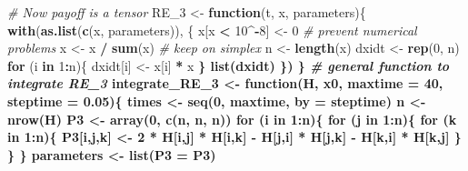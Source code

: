\documentclass[
]{book}
\newenvironment{Shaded}{\begin{snugshade}}{\end{snugshade}}
\newcommand{\CommentTok}[1]{\textcolor[rgb]{0.56,0.35,0.01}{\textit{#1}}}
\newcommand{\ControlFlowTok}[1]{\textcolor[rgb]{0.13,0.29,0.53}{\textbf{#1}}}
\newcommand{\DataTypeTok}[1]{\textcolor[rgb]{0.13,0.29,0.53}{#1}}
\newcommand{\DecValTok}[1]{\textcolor[rgb]{0.00,0.00,0.81}{#1}}
\newcommand{\FloatTok}[1]{\textcolor[rgb]{0.00,0.00,0.81}{#1}}
\newcommand{\KeywordTok}[1]{\textcolor[rgb]{0.13,0.29,0.53}{\textbf{#1}}}
\newcommand{\NormalTok}[1]{#1}
\newcommand{\OperatorTok}[1]{\textcolor[rgb]{0.81,0.36,0.00}{\textbf{#1}}}
\newcommand{\StringTok}[1]{\textcolor[rgb]{0.31,0.60,0.02}{#1}}
\begin{document}
\begin{Shaded}
\begin{Highlighting}[]
\CommentTok{# Now payoff is a tensor}
\NormalTok{RE_}\DecValTok{3}\NormalTok{ <-}\StringTok{ }\ControlFlowTok{function}\NormalTok{(t, x, parameters)\{}
  \KeywordTok{with}\NormalTok{(}\KeywordTok{as.list}\NormalTok{(}\KeywordTok{c}\NormalTok{(x, parameters)), \{}
\NormalTok{    x[x }\OperatorTok{<}\StringTok{ }\DecValTok{10}\OperatorTok{^-}\DecValTok{8}\NormalTok{] <-}\StringTok{ }\DecValTok{0} \CommentTok{# prevent numerical problems}
\NormalTok{    x <-}\StringTok{ }\NormalTok{x }\OperatorTok{/}\StringTok{ }\KeywordTok{sum}\NormalTok{(x) }\CommentTok{# keep on simplex}
\NormalTok{    n <-}\StringTok{ }\KeywordTok{length}\NormalTok{(x)}
\NormalTok{    dxidt <-}\StringTok{ }\KeywordTok{rep}\NormalTok{(}\DecValTok{0}\NormalTok{, n)}
    \ControlFlowTok{for}\NormalTok{ (i }\ControlFlowTok{in} \DecValTok{1}\OperatorTok{:}\NormalTok{n)\{}
\NormalTok{      dxidt[i] <-}\StringTok{ }\NormalTok{x[i] }\OperatorTok{*}\StringTok{ }\NormalTok{x }\OperatorTok{%
\NormalTok{    \}}
    \KeywordTok{list}\NormalTok{(dxidt)}
\NormalTok{  \})}
\NormalTok{\}}
\CommentTok{# general function to integrate RE_3}
\NormalTok{integrate_RE_}\DecValTok{3}\NormalTok{ <-}\StringTok{ }\ControlFlowTok{function}\NormalTok{(H, x0, }\DataTypeTok{maxtime =} \DecValTok{40}\NormalTok{, }\DataTypeTok{steptime =} \FloatTok{0.05}\NormalTok{)\{}
\NormalTok{  times <-}\StringTok{ }\KeywordTok{seq}\NormalTok{(}\DecValTok{0}\NormalTok{, maxtime, }\DataTypeTok{by =}\NormalTok{ steptime)}
\NormalTok{  n <-}\StringTok{ }\KeywordTok{nrow}\NormalTok{(H)}
\NormalTok{  P3 <-}\StringTok{ }\KeywordTok{array}\NormalTok{(}\DecValTok{0}\NormalTok{, }\KeywordTok{c}\NormalTok{(n, n, n))}
  \ControlFlowTok{for}\NormalTok{ (i }\ControlFlowTok{in} \DecValTok{1}\OperatorTok{:}\NormalTok{n)\{}
    \ControlFlowTok{for}\NormalTok{ (j }\ControlFlowTok{in} \DecValTok{1}\OperatorTok{:}\NormalTok{n)\{}
      \ControlFlowTok{for}\NormalTok{ (k }\ControlFlowTok{in} \DecValTok{1}\OperatorTok{:}\NormalTok{n)\{}
\NormalTok{        P3[i,j,k] <-}\StringTok{ }\DecValTok{2} \OperatorTok{*}\StringTok{ }\NormalTok{H[i,j] }\OperatorTok{*}\StringTok{ }\NormalTok{H[i,k] }\OperatorTok{-}\StringTok{  }\NormalTok{H[j,i] }\OperatorTok{*}\StringTok{ }\NormalTok{H[j,k] }\OperatorTok{-}\StringTok{ }\NormalTok{H[k,i] }\OperatorTok{*}\StringTok{ }\NormalTok{H[k,j]}
\NormalTok{      \}}
\NormalTok{    \}}
\NormalTok{  \}}
\NormalTok{  parameters <-}\StringTok{ }\KeywordTok{list}\NormalTok{(}\DataTypeTok{P3 =}\NormalTok{ P3)}
}
\end{Highlighting}
\end{Shaded}
\end{document}
